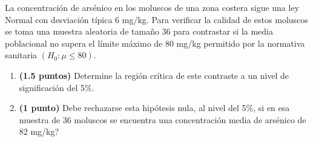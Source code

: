 
La concentración de arsénico en los moluscos de una zona costera sigue una ley Normal con desviación típica 6 mg/kg. Para verificar la calidad de estos moluscos se toma una muestra aleatoria de tamaño 36 para contrastar si la media poblacional no supera el límite máximo de 80 mg/kg permitido por la normativa sanitaria $(H_0:\mu\leq80)$.
\begin{enumerate}[label=\alph*)]
\item \textbf{(1.5 puntos)} Determine la región crítica de este contraste a un nivel de significación del 5\%.
\item \textbf{(1 punto)} \textquestiondown{}Debe rechazarse esta hipótesis nula, al nivel del 5\%, si en esa muestra de 36 moluscos se encuentra una concentración media de arsénico de 82 mg/kg?
\end{enumerate}
